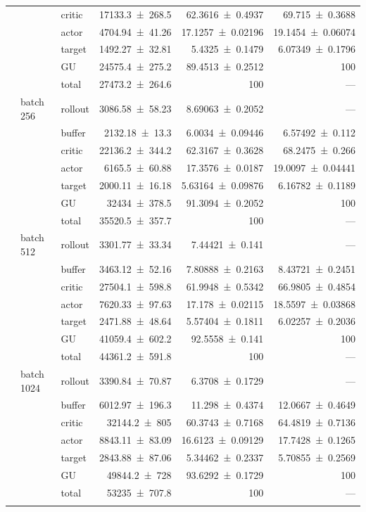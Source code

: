 {\begin{longtable}{@{}lllrrr@{}}
     &  & critic & \num{17133.3+-268.5} & \num{62.3616+-0.4937} & \num{69.715+-0.3688} \\
     &  & actor & \num{4704.94+-41.26} & \num{17.1257+-0.02196} & \num{19.1454+-0.06074} \\
     &  & target & \num{1492.27+-32.81} & \num{5.4325+-0.1479} & \num{6.07349+-0.1796} \\
     &  & GU & \num{24575.4+-275.2} & \num{89.4513+-0.2512} & 100 \\
     &  & total & \num{27473.2+-264.6} & \num{100} & --- \\
    \addlinespace[2pt]
     & batch 256 & rollout & \num{3086.58+-58.23} & \num{8.69063+-0.2052} & --- \\
     &  & buffer & \num{2132.18+-13.3} & \num{6.0034+-0.09446} & \num{6.57492+-0.112} \\
     &  & critic & \num{22136.2+-344.2} & \num{62.3167+-0.3628} & \num{68.2475+-0.266} \\
     &  & actor & \num{6165.5+-60.88} & \num{17.3576+-0.0187} & \num{19.0097+-0.04441} \\
     &  & target & \num{2000.11+-16.18} & \num{5.63164+-0.09876} & \num{6.16782+-0.1189} \\
     &  & GU & \num{32434+-378.5} & \num{91.3094+-0.2052} & 100 \\
     &  & total & \num{35520.5+-357.7} & \num{100} & --- \\
    \addlinespace[2pt]
     & batch 512 & rollout & \num{3301.77+-33.34} & \num{7.44421+-0.141} & --- \\
     &  & buffer & \num{3463.12+-52.16} & \num{7.80888+-0.2163} & \num{8.43721+-0.2451} \\
     &  & critic & \num{27504.1+-598.8} & \num{61.9948+-0.5342} & \num{66.9805+-0.4854} \\
     &  & actor & \num{7620.33+-97.63} & \num{17.178+-0.02115} & \num{18.5597+-0.03868} \\
     &  & target & \num{2471.88+-48.64} & \num{5.57404+-0.1811} & \num{6.02257+-0.2036} \\
     &  & GU & \num{41059.4+-602.2} & \num{92.5558+-0.141} & 100 \\
     &  & total & \num{44361.2+-591.8} & \num{100} & --- \\
    \addlinespace[2pt]
     & batch 1024 & rollout & \num{3390.84+-70.87} & \num{6.3708+-0.1729} & --- \\
     &  & buffer & \num{6012.97+-196.3} & \num{11.298+-0.4374} & \num{12.0667+-0.4649} \\
     &  & critic & \num{32144.2+-805} & \num{60.3743+-0.7168} & \num{64.4819+-0.7136} \\
     &  & actor & \num{8843.11+-83.09} & \num{16.6123+-0.09129} & \num{17.7428+-0.1265} \\
     &  & target & \num{2843.88+-87.06} & \num{5.34462+-0.2337} & \num{5.70855+-0.2569} \\
     &  & GU & \num{49844.2+-728} & \num{93.6292+-0.1729} & 100 \\
     &  & total & \num{53235+-707.8} & \num{100} & --- \\
    \addlinespace[2pt]
  \end{longtable}
}
